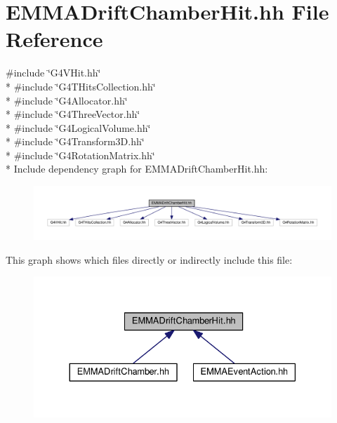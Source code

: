 \hypertarget{EMMADriftChamberHit_8hh}{}\section{E\+M\+M\+A\+Drift\+Chamber\+Hit.\+hh File Reference}
\label{EMMADriftChamberHit_8hh}
{\ttfamily \#include \char`\"{}G4\+V\+Hit.\+hh\char`\"{}}\\*
{\ttfamily \#include \char`\"{}G4\+T\+Hits\+Collection.\+hh\char`\"{}}\\*
{\ttfamily \#include \char`\"{}G4\+Allocator.\+hh\char`\"{}}\\*
{\ttfamily \#include \char`\"{}G4\+Three\+Vector.\+hh\char`\"{}}\\*
{\ttfamily \#include \char`\"{}G4\+Logical\+Volume.\+hh\char`\"{}}\\*
{\ttfamily \#include \char`\"{}G4\+Transform3\+D.\+hh\char`\"{}}\\*
{\ttfamily \#include \char`\"{}G4\+Rotation\+Matrix.\+hh\char`\"{}}\\*
Include dependency graph for E\+M\+M\+A\+Drift\+Chamber\+Hit.\+hh\+:
\nopagebreak
\begin{figure}[H]
\begin{center}
\leavevmode
\includegraphics[width=350pt]{EMMADriftChamberHit_8hh__incl}
\end{center}
\end{figure}
This graph shows which files directly or indirectly include this file\+:
\nopagebreak
\begin{figure}[H]
\begin{center}
\leavevmode
\includegraphics[width=330pt]{EMMADriftChamberHit_8hh__dep__incl}
\end{center}
\end{figure}
